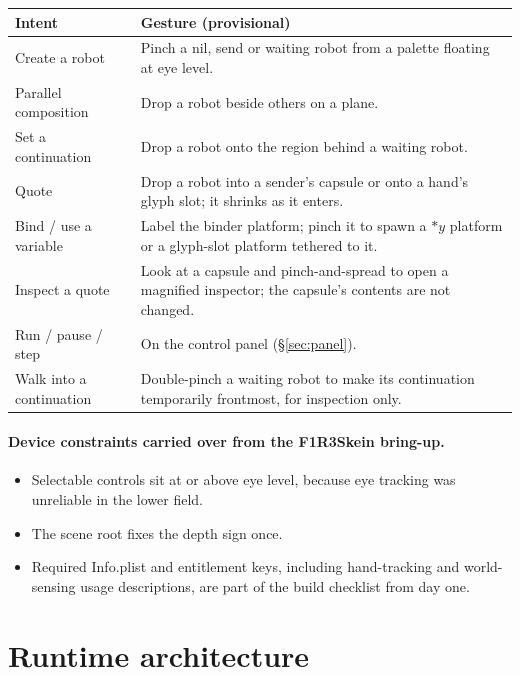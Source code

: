 \documentclass[11pt]{article}
\newcommand{\drop}[1]{{*}#1}
\begin{document}
\begin{table}[h]
\centering\small
\begin{tabularx}{\linewidth}{@{}l X@{}}
\toprule
Intent & Gesture (provisional)\\
\midrule
Create a robot & Pinch a nil, send or waiting robot from a palette floating at eye level.\\
Parallel composition & Drop a robot beside others on a plane.\\
Set a continuation & Drop a robot onto the region behind a waiting robot.\\
Quote & Drop a robot into a sender's capsule or onto a hand's glyph slot; it shrinks as it enters.\\
Bind / use a variable & Label the binder platform; pinch it to spawn a $\drop{y}$ platform or a glyph-slot platform tethered to it.\\
Inspect a quote & Look at a capsule and pinch-and-spread to open a magnified inspector; the capsule's contents are not changed.\\
Run / pause / step & On the control panel (\S\ref{sec:panel}).\\
Walk into a continuation & Double-pinch a waiting robot to make its continuation temporarily frontmost, for inspection only.\\
\bottomrule
\end{tabularx}
\end{table}

\paragraph{Device constraints carried over from the F1R3Skein bring-up.}
\begin{itemize}
  \item Selectable controls sit at or above eye level, because eye tracking was unreliable
    in the lower field.
  \item The scene root fixes the depth sign once.
  \item Required Info.plist and entitlement keys, including hand-tracking and world-sensing
    usage descriptions, are part of the build checklist from day one.
\end{itemize}

\section{Runtime architecture}\label{sec:runtime}
\end{document}
